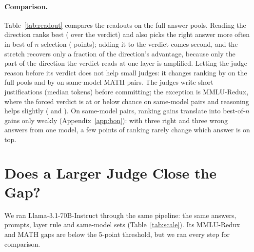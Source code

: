 \documentclass[11pt]{article}
\begin{document}
\paragraph{Comparison.} Table~\ref{tab:readout} compares the readouts on the full answer pools. Reading the direction ranks best ( over the verdict) and also picks the right answer more often in best-of-$n$ selection ( points); adding it to the verdict comes second, and the stretch recovers only a fraction of the direction's advantage, because only the part of the direction the verdict reads at one layer is amplified. Letting the judge reason before its verdict does not help small judges: it changes ranking by  on the full pools and by  on same-model MATH pairs. The judges write short justifications (median  tokens) before committing; the exception is MMLU-Redux, where the forced verdict is at or below chance on same-model pairs and reasoning helps slightly ( and ). On same-model pairs, ranking gains translate into best-of-$n$ gains only weakly (Appendix~\ref{app:bon}): with three right and three wrong answers from one model, a few points of ranking rarely change which answer is on top.

\section{Does a Larger Judge Close the Gap?}
\label{sec:scale}

\begin{table}[t]
\centering
\small

\caption{Llama judges by size, on the main answer pools. Solves: share of the pool's questions the judge answers correctly itself (\%). Verdict: the verdict's ranking ($\times$100). Gap: the best layer's direction ranking minus the verdict's. Same model: the verdict's ranking on same-model pairs (Qwen3.5-4B answers) on questions the judge cannot solve; Llama-3.2-3B has no MMLU-Redux same-model run.}
\label{tab:scale}
\end{table}

We ran Llama-3.1-70B-Instruct through the same pipeline: the same answers, prompts, layer rule and same-model sets (Table~\ref{tab:scale}). Its MMLU-Redux and MATH gaps are below the 5-point threshold, but we ran every step for comparison.
\end{document}
